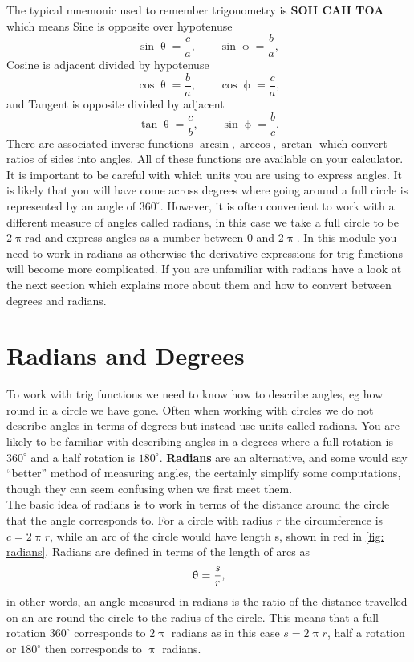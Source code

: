 The typical mnemonic used to remember trigonometry is \textbf{SOH CAH TOA} which means Sine is opposite over hypotenuse
\begin{equation*}
\sin\uptheta=\frac{c}{a}, \qquad \sin\upphi =\frac{b}{a},
\end{equation*}
Cosine is adjacent divided by hypotenuse
\begin{equation*}
\cos\uptheta=\frac{b}{a}, \qquad \cos\upphi =\frac{c}{a},
\end{equation*}
and Tangent is opposite divided by adjacent
\begin{equation*}
\tan\uptheta=\frac{c}{b}, \qquad \sin\upphi =\frac{b}{c}.
\end{equation*}
There are associated inverse functions $\arcsin,\arccos,\arctan$ which convert ratios of sides into angles. All of these functions are available on your calculator. \\

It is important to be careful with which units you are using to express angles. It is likely that you will have come across degrees where going around a full circle is represented by an angle of $360^{\circ}$. However, it is often convenient to work with a different measure of angles called radians, in this case we take a full circle to be $2\uppi\text{rad}$ and express angles as a number between $0$ and $2\uppi$. In this module you need to work in radians as otherwise the derivative expressions for trig functions will become more complicated. If you are unfamiliar with  radians have a look at the next section which explains more about them and how to convert between degrees and radians.

\section{Radians and Degrees}
To work with trig functions  we need to know how to describe angles, eg how round in a circle we have gone. Often when working with circles we do not describe angles in terms of degrees but instead use units called radians.  You are likely to be familiar with describing angles in a degrees where a full rotation is $360^{\circ}$ and a half rotation is $180^{\circ}$. \textbf{Radians} are an alternative, and some would say ``better'' method of measuring angles, the certainly simplify some computations, though they can seem confusing when we first meet them.\\

The basic idea of radians is to work in terms of the distance around the circle that the angle corresponds to.  For a circle with radius $r$ the circumference is $c=2\uppi r$, while an arc of the circle would have length s, shown in red in \cref{fig: radians}. Radians are defined in terms of the length of arcs as
\begin{equation}
\uptheta =\frac{s}{r},
\label{eq: definition of radians}
\end{equation}
in other words, an angle measured in radians is the ratio of the distance travelled on an arc round the circle to the radius of the circle. 
This means that a full rotation $360^{\circ}$ corresponds to $2\uppi$ radians as in this case $s=2\uppi r$, half a rotation or $180^{\circ}$ then corresponds to $\uppi$ radians. 


